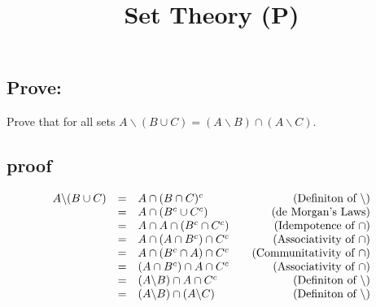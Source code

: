 \documentclass{article}
\title{Set Theory (P)}
\author{}
\date{}
\begin{document}
	\begin{spacing}{1.5}
		\maketitle
		
		\section*{Prove:}
		Prove that for all sets $A \backslash (B \cup C) = (A \backslash B) \cap (A \backslash C)$.
		
		\subsection*{proof}
		\[
		\begin{array}{rclr}
			A \backslash (B \cup C) &=& A \cap (B \cap C)^{c} &\quad\text{(Definiton of $\backslash$)}\\
			&=& A \cap (B^{c} \cup C^{c}) &\quad\text{(de Morgan's Laws)}\\
			&=& A\cap A \cap (B^{c} \cap C^{c}) &\quad\text{(Idempotence of $ \cap $)}\\
			&=& A\cap (A \cap B^{c}) \cap C^{c} &\quad\text{(Associativity of $ \cap $)}\\
			&=& A\cap (B^{c} \cap A) \cap C^{c} &\quad\text{(Communitativity of $ \cap $)}\\
			&=& (A\cap B^{c}) \cap A \cap C^{c} &\quad\text{(Associativity of $ \cap $)}\\
			&=& (A\backslash B) \cap A \cap C^{c} &\quad\text{(Definiton of $\backslash$)}\\
			&=& (A\backslash B) \cap (A \backslash C) &\quad\text{(Definiton of $\backslash$)}\\
		\end{array}
		\]
	
		
	\end{spacing}
	
	
	
\end{document}
